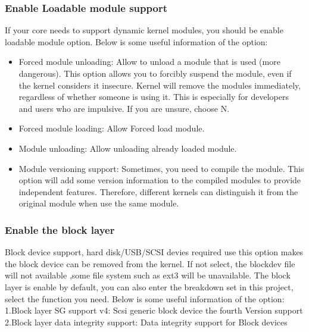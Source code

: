 \documentclass[10pt,draftclsnofoot,peerreview ,letterpaper,onecolumn,]{IEEEtran}
\begin{document}
	\subsubsection{Enable Loadable module support}
	If your core needs to support dynamic kernel modules, you should be enable loadable module option. Below is some useful information of the option: 
	\begin{itemize}
		\item Forced module unloading: 
         Allow to unload a module that is used (more dangerous). This option allows you to forcibly suspend the module, even if the kernel considers it insecure. Kernel will remove the modules immediately, regardless of whether someone is using it. This is especially for developers and users who are impulsive. If you are unsure, choose N.\\
		\item Forced module loading: Allow Forced load module. \\
		\item Module unloading: Allow unloading already loaded module. \\
		\item Module versioning support: Sometimes, you need to compile the module. This option will add some version information to the compiled modules to provide independent features. Therefore, different kernels can distinguish it from the original module when use the same module. 
	\end{itemize}
	\subsubsection{Enable the block layer} 
	Block device support, hard disk/USB/SCSI devies required use this option makes the block device can be removed from the kernel. If not select, the blockdev file will not available ,some file system such as ext3 will be unavailable. The block layer is enable by default, you can also enter the breakdown set in this project, select the function you need. Below is some useful information of the option: 
	1.Block layer SG support v4: Scsi generic block device the fourth Version support\\
	2.Block layer data integrity support: Data integrity support for Block devices \\
\end{document}
